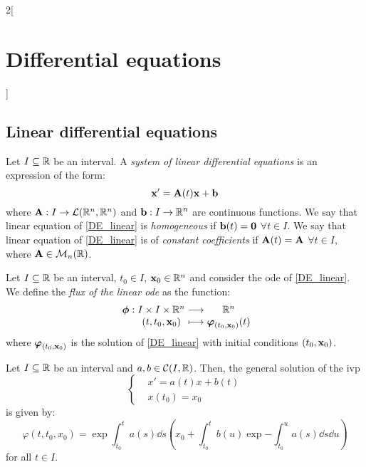 \documentclass[../../../main.tex]{subfiles}
\begin{document}
\begin{multicols}{2}[\section{Differential equations}]
    \subsection{Linear differential equations}
    \begin{definition}
        Let $I\subseteq\mathbb{R}$ be an interval. A \textit{system of linear differential equations} is an expression of the form:
        \begin{equation}\label{DE_linear}
            \boldsymbol{\mathrm{x}}'=\boldsymbol{\mathrm{A}}(t)\boldsymbol{\mathrm{x}}+\boldsymbol{\mathrm{b}}
        \end{equation}
        where $\boldsymbol{\mathrm{A}}:I\rightarrow\mathcal{L}(\mathbb{R}^n,\mathbb{R}^n)$ and $\boldsymbol{\mathrm{b}}:I\rightarrow\mathbb{R}^n$ are continuous functions.
        We say that linear equation of \cref{DE_linear} is \textit{homogeneous} if $\boldsymbol{\mathrm{b}}(t)=\boldsymbol{\mathrm{0}}$ $\forall t\in I$. We say that linear equation of \cref{DE_linear} is of \textit{constant coefficients} if $\boldsymbol{\mathrm{A}}(t)=\boldsymbol{\mathrm{A}}$ $\forall t\in I$, where $\boldsymbol{\mathrm{A}}\in\mathcal{M}_n(\mathbb{R})$.
    \end{definition}
    \begin{definition}
        Let $I\subseteq\mathbb{R}$ be an interval, $t_0\in I$, $\boldsymbol{\mathrm{x}}_0\in\mathbb{R}^n$ and consider the ode of \cref{DE_linear}. We define the \textit{flux of the linear ode} as the function:
        $$
            \function{\vf{\phi}}{I\times I\times \RR^n}{\RR^n}{(t,t_0,\vf{x}_0)}{\vf{\varphi}_{(t_0,\vf{x}_0)}(t)}
        $$
        where $\boldsymbol{\mathrm{\varphi}}_{(t_0,\boldsymbol{\mathrm{x}}_0)}$ is the solution of \cref{DE_linear} with initial conditions $(t_0,\boldsymbol{\mathrm{x}}_0)$.
    \end{definition}
    \begin{prop}
        Let $I\subseteq\mathbb{R}$ be an interval and $a,b\in\mathcal{C}(I,\mathbb{R})$. Then, the general solution of the ivp
        $$\left\{
            \begin{aligned}
                 & x'      =a(t)x+b(t) \\
                 & x(t_0)  =x_0
            \end{aligned}
            \right.$$
        is given by:
        \begin{equation}\label{DE_sol-lin}
            \varphi(t,t_0,x_0)=\exp{\int_{t_0}^ta(s)\dd s}\left(x_0+\int_{t_0}^tb(u)\exp{-\int_{t_0}^ua(s)\dd s}\dd u\right)
        \end{equation}
        for all $t\in I$.
    \end{prop}

\end{multicols}
\end{document}
